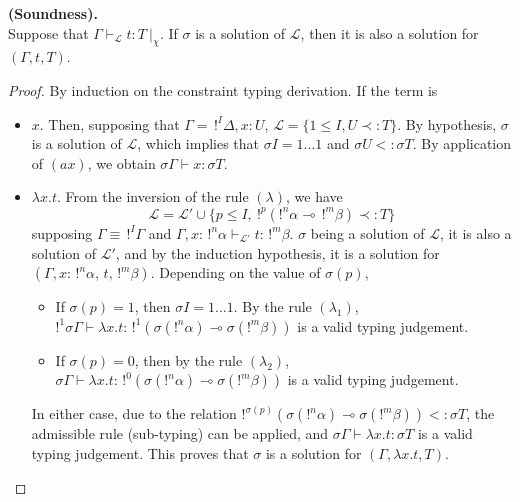 \begin{prop}{\bf (Soundness).} \\
	Suppose that $\Gamma \vdash_\mathcal{L} t : T ~|_\chi$. If $\sigma$ is a solution
	of $\mathcal{L}$, then it is also a solution for $(\Gamma, t, T)$.

	\begin{proof}
 		By induction on the constraint typing derivation. If the term is
 		\begin{itemize}
 		\item $x$. Then, supposing that $\Gamma = \,!^I\Delta, x : U$, $\mathcal{L} = \{ 1 \le I, U \prec: T \}$. By hypothesis, $\sigma$ is a solution
 			of $\mathcal{L}$, which implies that $\sigma I = 1 \dots 1$ and $\sigma U <: \sigma T$.
 			By application of $(ax)$, we obtain $\sigma \Gamma \vdash x : \sigma T$.
 			
 		\item $\lambda x.t$. From the inversion of the rule $(\lambda)$, we have
		 		$$\mathcal{L} = \mathcal{L'} \cup \{p \le I, ~!^p(!^n\alpha \multimap \,!^m\beta) \prec: T\}$$
		 	supposing $\Gamma \equiv \,!^I \Gamma$ and $\Gamma, x : \,!^n\alpha \vdash_\mathcal{L'} t : \,!^m\beta$.
		 	$\sigma$ being a solution of $\mathcal{L}$, it is also a solution of $\mathcal{L'}$, and
		 	by the induction hypothesis, it is a solution for $(\Gamma, x : \,!^n\alpha, \,t, \,!^m\beta)$. Depending on the value
		 	of $\sigma (p)$,
		 	\begin{itemize}
		 		\item If $\sigma(p) = 1$, then $\sigma I = 1 \dots 1$. By the rule $(\lambda_1)$,
		 			$!^1\sigma\Gamma \vdash \lambda x.t : \,!^1(\sigma(!^n \alpha) \multimap \sigma(!^m \beta))$ is a valid typing judgement.
		 			
		 		\item If $\sigma(p) = 0$, then by the rule $(\lambda_2)$,
		 			$\sigma\Gamma \vdash \lambda x.t : \,!^0(\sigma(!^n \alpha) \multimap \sigma(!^m \beta))$ is a valid typing judgement.
		 	\end{itemize}
			In either case, due to the relation $!^{\sigma(p)} (\sigma(!^n\alpha) \multimap \sigma(!^m\beta)) <: \sigma T$, the admissible rule
			(sub-typing) can be applied, and $\sigma \Gamma \vdash \lambda x . t : \sigma T$ is a valid typing judgement.
			This proves that $\sigma$ is a solution for $(\Gamma, \lambda x.t, T)$.
		

\end{itemize}
\end{proof}
\end{prop}
